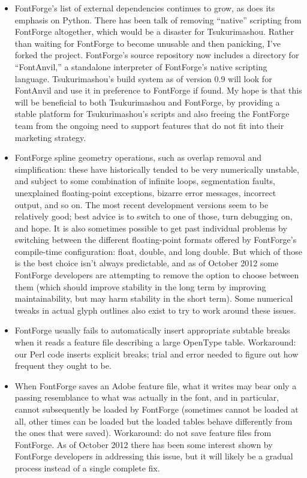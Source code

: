 \documentclass[14pt]{extarticle}
\begin{document}
\begin{itemize}
  \item FontForge's list of external dependencies continues to grow, as does
    its emphasis on Python.  There has been talk of removing ``native''
    scripting from FontForge altogether, which would be a disaster for
    Tsukurimashou.  Rather than waiting for FontForge to become unusable and
    then panicking, I've forked the project.  FontForge's source repository
    now includes a directory for ``FontAnvil,'' a standalone interpreter of
    FontForge's native scripting language.  Tsukurimashou's build system
    as of version 0.9 will look for FontAnvil and use it in preference to
    FontForge if found.  My hope is that this will be beneficial to both
    Tsukurimashou and FontForge, by providing a stable platform for
    Tsukurimashou's scripts and also freeing the FontForge team from the
    ongoing need to support features that do not fit into their marketing
    strategy.

  \item FontForge spline geometry operations, such as overlap removal and
    simplification: these have historically tended to be very numerically
    unstable, and subject to some combination of infinite loops,
    segmentation faults, unexplained floating-point exceptions, bizarre
    error messages, incorrect output, and so on.  The most recent
    development versions seem to be relatively good; best advice is to
    switch to one of those, turn debugging on, and hope.  It is also
    sometimes possible to get past individual problems by switching between
    the different floating-point formats offered by FontForge's compile-time
    configuration: float, double, and long double.  But which of those is
    the best choice isn't always predictable, and as of October 2012 some
    FontForge developers are attempting to remove the option to choose
    between them (which should improve stability in the long term by
    improving maintainability, but may harm stability in the short term). 
    Some numerical tweaks in actual glyph outlines also exist to try to work
    around these issues.

  \item FontForge usually fails to automatically insert appropriate
    subtable breaks when it reads a feature file describing a large
    OpenType table.  Workaround:  our Perl code inserts explicit breaks;
    trial and error needed to figure out how frequent they ought to be.

  \item When FontForge saves an Adobe feature file, what it writes may bear
    only a passing resemblance to what was actually in the font, and in
    particular, cannot subsequently be loaded by FontForge (sometimes cannot
    be loaded at all, other times can be loaded but the loaded tables behave
    differently from the ones that were saved).  Workaround:  do not save
    feature files from FontForge.  As of October 2012 there has been some
    interest shown by FontForge developers in addressing this issue, but it
    will likely be a gradual process instead of a single complete fix.


\end{itemize}
\end{document}
